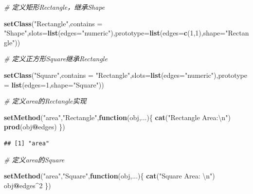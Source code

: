 \documentclass[]{book}
\newenvironment{Shaded}{\begin{snugshade}}{\end{snugshade}}
\newcommand{\KeywordTok}[1]{\textcolor[rgb]{0.13,0.29,0.53}{\textbf{#1}}}
\newcommand{\DataTypeTok}[1]{\textcolor[rgb]{0.13,0.29,0.53}{#1}}
\newcommand{\DecValTok}[1]{\textcolor[rgb]{0.00,0.00,0.81}{#1}}
\newcommand{\CharTok}[1]{\textcolor[rgb]{0.31,0.60,0.02}{#1}}
\newcommand{\StringTok}[1]{\textcolor[rgb]{0.31,0.60,0.02}{#1}}
\newcommand{\CommentTok}[1]{\textcolor[rgb]{0.56,0.35,0.01}{\textit{#1}}}
\newcommand{\ControlFlowTok}[1]{\textcolor[rgb]{0.13,0.29,0.53}{\textbf{#1}}}
\newcommand{\OperatorTok}[1]{\textcolor[rgb]{0.81,0.36,0.00}{\textbf{#1}}}
\newcommand{\NormalTok}[1]{#1}
\begin{document}
\begin{Shaded}
\begin{Highlighting}[]
\CommentTok{# 定义矩形Rectangle，继承Shape}

\KeywordTok{setClass}\NormalTok{(}\StringTok{"Rectangle"}\NormalTok{,}\DataTypeTok{contains =} \StringTok{"Shape"}\NormalTok{,}\DataTypeTok{slots=}\KeywordTok{list}\NormalTok{(}\DataTypeTok{edges=}\StringTok{"numeric"}\NormalTok{),}\DataTypeTok{prototype=}\KeywordTok{list}\NormalTok{(}\DataTypeTok{edges=}\KeywordTok{c}\NormalTok{(}\DecValTok{1}\NormalTok{,}\DecValTok{1}\NormalTok{),}\DataTypeTok{shape=}\StringTok{"Rectangle"}\NormalTok{))}

\CommentTok{# 定义正方形Square继承Rectangle}

\KeywordTok{setClass}\NormalTok{(}\StringTok{"Square"}\NormalTok{,}\DataTypeTok{contains =} \StringTok{"Rectangle"}\NormalTok{,}\DataTypeTok{slots=}\KeywordTok{list}\NormalTok{(}\DataTypeTok{edges=}\StringTok{"numeric"}\NormalTok{),}\DataTypeTok{prototype =} \KeywordTok{list}\NormalTok{(}\DataTypeTok{edges=}\DecValTok{1}\NormalTok{,}\DataTypeTok{shape=}\StringTok{"Square"}\NormalTok{))}

\CommentTok{# 定义area的Rectangle实现}

\KeywordTok{setMethod}\NormalTok{(}\StringTok{"area"}\NormalTok{,}\StringTok{"Rectangle"}\NormalTok{,}\ControlFlowTok{function}\NormalTok{(obj,...)\{}
  \KeywordTok{cat}\NormalTok{(}\StringTok{"Rectangle Area:}\CharTok{\textbackslash{}n}\StringTok{"}\NormalTok{)}
  \KeywordTok{prod}\NormalTok{(obj}\OperatorTok{@}\NormalTok{edges)}
\NormalTok{\})}
\end{Highlighting}
\end{Shaded}

\begin{verbatim}
## [1] "area"
\end{verbatim}

\begin{Shaded}
\begin{Highlighting}[]
\CommentTok{# 定义area的Square}

\KeywordTok{setMethod}\NormalTok{(}\StringTok{"area"}\NormalTok{,}\StringTok{"Square"}\NormalTok{,}\ControlFlowTok{function}\NormalTok{(obj,...)\{}
  \KeywordTok{cat}\NormalTok{(}\StringTok{"Square Area: }\CharTok{\textbackslash{}n}\StringTok{"}\NormalTok{)}
\NormalTok{  obj}\OperatorTok{@}\NormalTok{edges}\OperatorTok{^}\DecValTok{2}
\NormalTok{\})}
\end{Highlighting}
\end{Shaded}
\end{document}
